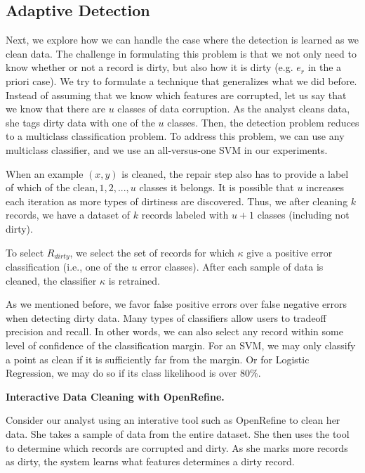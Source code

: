 \subsection{Adaptive Detection}
Next, we explore how we can handle the case where the detection is learned as we clean data.
The challenge in formulating this problem is that we not only need to know whether or not a record is dirty, but also how it is dirty (e.g. $e_r$ in the a priori case).
We try to formulate a technique that generalizes what we did before.
Instead of assuming that we know which features are corrupted, let us say that we know that there are $u$ classes of data corruption.
As the analyst cleans data, she tags dirty data with one of the $u$ classes.
Then, the detection problem reduces to a multiclass classification problem.
To address this problem, we can use any multiclass classifier, and we use an all-versus-one SVM in our experiments.

When an example $(x,y)$ is cleaned, the repair step also has to provide a label of which of the ${\text{clean}, 1,2,...,u}$ classes it belongs. It is possible that $u$ increases each iteration as more types of dirtiness are discovered. 
Thus, we after cleaning $k$ records, we have a dataset of $k$ records labeled with $u+1$ classes (including not dirty).

\begin{definition}
To select $R_{dirty}$, we select the set of records for which $\kappa$ give a positive error classification (i.e., one of the $u$ error classes).
After each sample of data is cleaned, the classifier $\kappa$ is retrained.
\end{definition}

As we mentioned before, we favor false positive errors over false negative errors when detecting dirty data.
Many types of classifiers allow users to tradeoff precision and recall.
In other words, we can also select any record within some level of confidence of the classification margin.
For an SVM, we may only classify a point as clean if it is sufficiently far from the margin.
Or for Logistic Regression, we may do so if its class likelihood is over 80\%.

\vspace{0.5em}

\noindent\textbf{Interactive Data Cleaning with OpenRefine.}
\begin{example}
Consider our analyst using an interative tool such as OpenRefine \cite{openrefine} to clean her data. 
She takes a sample of data from the entire dataset.
She then uses the tool to determine which records are corrupted and dirty.
As she marks more records as dirty, the system learns what features determines a dirty record.
\end{example}